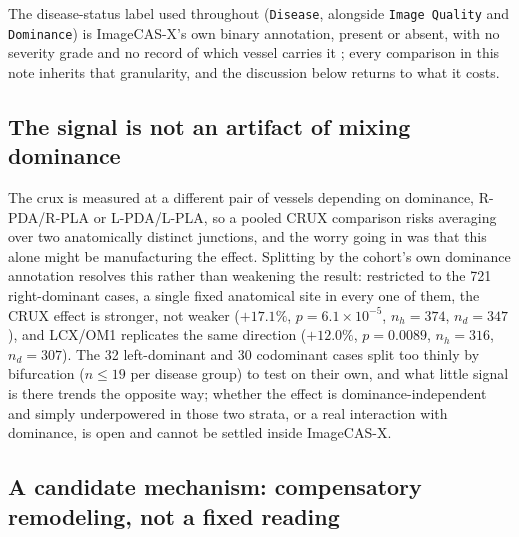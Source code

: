 The disease-status label used throughout (\texttt{Disease}, alongside \texttt{Image Quality} and
\texttt{Dominance}) is ImageCAS-X's own binary annotation, present or absent, with no severity
grade and no record of which vessel carries it \cite{bransby2026imagecasx}; every comparison in
this note inherits that granularity, and the discussion below returns to what it costs.

\subsection*{The signal is not an artifact of mixing dominance}

The crux is measured at a different pair of vessels depending on dominance, R-PDA/R-PLA or
L-PDA/L-PLA, so a pooled CRUX comparison risks averaging over two anatomically distinct junctions,
and the worry going in was that this alone might be manufacturing the effect. Splitting by the
cohort's own dominance annotation resolves this rather than weakening the result: restricted to the
721 right-dominant cases, a single fixed anatomical site in every one of them, the CRUX effect is
stronger, not weaker ($+17.1\%$, $p = 6.1\times10^{-5}$, $n_h=374$, $n_d=347$), and LCX/OM1
replicates the same direction ($+12.0\%$, $p = 0.0089$, $n_h=316$, $n_d=307$). The 32 left-dominant
and 30 codominant cases split too thinly by bifurcation ($n \le 19$ per disease group) to test on
their own, and what little signal is there trends the opposite way; whether the effect is
dominance-independent and simply underpowered in those two strata, or a real interaction with
dominance, is open and cannot be settled inside ImageCAS-X.

\subsection*{A candidate mechanism: compensatory remodeling, not a fixed reading}

